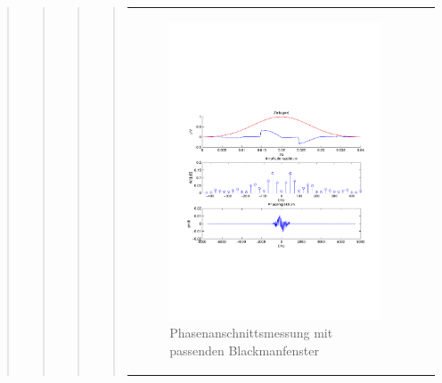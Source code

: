 \begin{quote}
\begin{quote}
\begin{quote}
\begin{quote}
\begin{center}
\begin{tabular}{ll}
\begin{minipage}{0.6\textwidth}
                        \begin{figure}[H]
                            \label{fig:}
                            \includegraphics[scale=0.4, trim = 1.5cm 7cm 1.5cm 8cm,
                            clip]{./Bilder/Phasenanschnittsmessungmitblackmanfenster} %
                            \caption{Phasenanschnittsmessung mit passenden Blackmanfenster}
                        \end{figure}
    
                    \end{minipage}
                    \begin{minipage}{0.6\textwidth}
    

\end{minipage}
\end{tabular}
\end{center}
\end{quote}
\end{quote}
\end{quote}
\end{quote}
